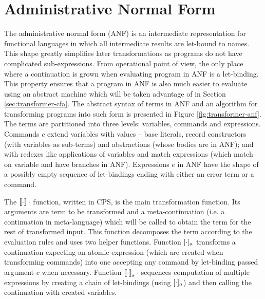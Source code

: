 \section{Administrative Normal Form}
The administrative normal form (ANF) \cite{flanagan-anf} is an intermediate representation for functional languages in which all intermediate results are let-bound to names.
This shape greatly simplifies later transformations as programs do not have complicated sub-expressions.
From operational point of view, the only place where a continuation is grown when evaluating program in ANF is a let-binding.
This property ensures that a program in ANF is also much easier to evaluate using an abstract machine which will be taken advantage of in Section \ref{sec:transformer-cfa}.
The abstract syntax of terms in ANF and an algorithm for transforming \IDL{} programs into such form is presented in Figure \ref{fig:transformer-anf}.
The terms are partitioned into three levels: variables, commands and expressions.
Commands $c$ extend variables with values -- base literals, record constructors (with variables as sub-terms) and abstractions (whose bodies are in ANF); and with redexes like applications of variables and match expressions (which match on variable and have branches in ANF).
Expressions $e$ in ANF have the shape of a possibly empty sequence of let-bindings ending with either an error term or a command.

The $\left\llbracket \cdot \right\rrbracket\cdot$ function, written in CPS, is the main transformation function.
Its arguments are term to be transformed and a meta-continuation (i.e. a continuation in meta-language) which will be called to obtain the term for the rest of transformed input.
This function decomposes the term according to the evaluation rules and uses two helper functions.
Function $[ \cdot ]_{a}$ transforms a continuation expecting an atomic expression (which are created when transforming commands) into one accepting any command by let-binding passed argument $c$ when necessary.
Function $\left\llbracket \cdot \right\rrbracket_{s} \cdot$ sequences computation of multiple expressions by creating a chain of let-bindings (using $[ \cdot ]_{a}$) and then calling the continuation with created variables.


